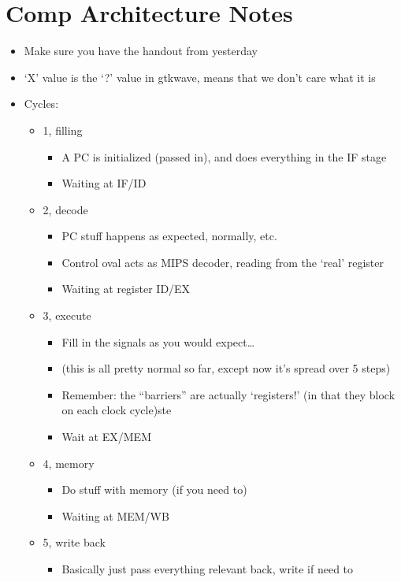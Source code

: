 \documentclass{article}
\begin{document}
\section*{Comp Architecture Notes}
\begin{itemize}
\item  Make sure you have the handout from yesterday
\item  ‘X’ value is the ‘?’ value in gtkwave, means that we don’t care what it is
\item  Cycles:
\begin{itemize}
\item  1, filling
\begin{itemize}
\item  A PC is initialized (passed in), and does everything in the IF stage
\item  Waiting at IF/ID
\end{itemize}
\item  2, decode
\begin{itemize}
\item  PC stuff happens as expected, normally, etc.
\item  Control oval acts as MIPS decoder, reading from the ‘real’ register
\item  Waiting at register ID/EX
\end{itemize}
\item  3, execute
\begin{itemize}
\item  Fill in the signals as you would expect…
\item  (this is all pretty normal so far, except now it’s spread over 5 steps)
\item  Remember: the “barriers” are actually ‘registers!’ (in that they block on each clock cycle)ste
\item  Wait at EX/MEM
\end{itemize}
\item  4, memory
\begin{itemize}
\item  Do stuff with memory (if you need to)
\item  Waiting at MEM/WB
\end{itemize}
\item  5, write back
\begin{itemize}
\item  Basically just pass everything relevant back, write if need to
\end{itemize}
\end{itemize}

\end{itemize}
\end{document}
